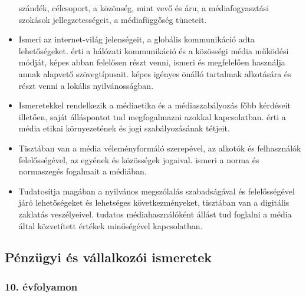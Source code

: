 \begin{itemize}
  szándék, célcsoport, a közönség, mint vevő és áru, a médiafogyasztási
  szokások jellegzetességeit, a médiafüggőség tüneteit.
\item
  Ismeri az internet-világ jelenségeit, a globális kommunikáció adta
  lehetőségeket. érti a hálózati kommunikáció és a közösségi média
  működési módját, képes abban felelősen részt venni, ismeri és
  megfelelően használja annak alapvető szövegtípusait. képes igényes
  önálló tartalmak alkotására és részt venni a lokális nyilvánosságban.
\item
  Ismeretekkel rendelkezik a médiaetika és a médiaszabályozás főbb
  kérdéseit illetően, saját álláspontot tud megfogalmazni azokkal
  kapcsolatban. érti a média etikai környezetének és jogi
  szabályozásának tétjeit.
\item
  Tisztában van a média véleményformáló szerepével, az alkotók és
  felhasználók felelősségével, az egyének és közösségek jogaival. ismeri
  a norma és normaszegés fogalmait a médiában.
\item
  Tudatosítja magában a nyilvános megszólalás szabadságával és
  felelősségével járó lehetőségeket és lehetséges következményeket,
  tisztában van a digitális zaklatás veszélyeivel. tudatos
  médiahasználóként állást tud foglalni a média által közvetített
  értékek minőségével kapcsolatban.
\end{itemize}

\hypertarget{penzugyi-es-vallalkozoi-ismeretek}{%
\subsection{Pénzügyi és vállalkozói
ismeretek}\label{penzugyi-es-vallalkozoi-ismeretek}}

\hypertarget{evfolyamon-29}{%
\subsubsection{10. évfolyamon}\label{evfolyamon-29}}

